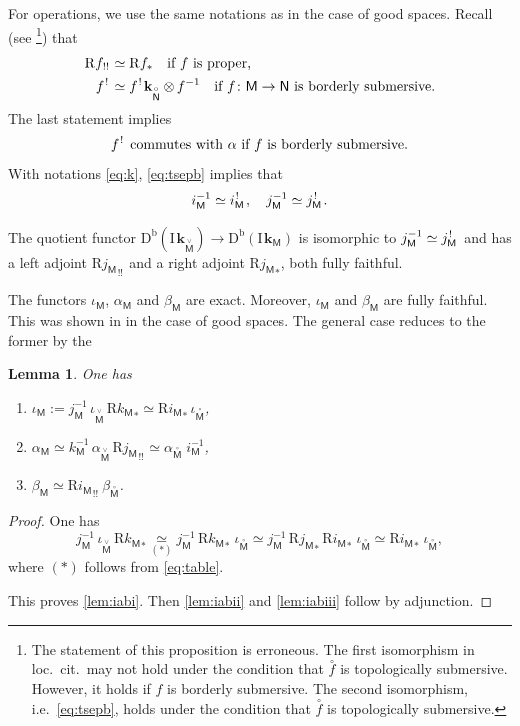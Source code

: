 \documentclass[11pt]{article}
\numberwithin{equation}{section}
\newenvironment{enumeratei}
{\bgroup\def\theenumi{\roman{enumi}}\def\theenumii{\alph{enumii}}\begin{enumerate}}
{\end{enumerate}\egroup}
\newcommand{\accentset}[2]{\overset{#1}{#2}}
\theoremstyle{plain}
\newtheorem{lemma}[theorem]{Lemma}
\theoremstyle{definition}
\newcommand{\derived}[1]{\mathrm{#1}}
\newcommand{\derd}{\derived{D}}
\newcommand{\derr}{\derived{R}}
\newcommand{\BDC}{\derd^{\mathrm{b}}}
\newcommand{\roim}[1]{\derr#1_*}
\newcommand{\reeim}[1]{\derr#1_{\mspace{1mu}!!}\mspace{1mu}}
\newcommand{\epb}[1]{#1^{\mspace{1.5mu}!}\mspace{2mu}}
\newcommand{\field}{\mathbf{k}}\let\cor\field
\newcommand{\ind}{\mathrm{I}\mspace{2mu}}
\newcommand{\ifield}{\ind\field}
\newcommand{\bclose}[1]{{\accentset{\vee}{#1}}}\let\cc\bclose
\newcommand{\unbordered}[1]{{\accentset{\circ}{#1}}}
\let\oo \unbordered
\newcommand{\bbM}{\mathsf{M}}
\newcommand{\obM}{\unbordered{\bbM}}
\newcommand{\cbM}{\bclose{\bbM}}
\newcommand{\bbN}{\mathsf{N}}
\newcommand{\obN}{\unbordered{\bbN}}
\newcommand{\inc}[1][\bbM]{k_{#1}}
\newcommand{\defeq}{\mathbin{:=}}\let \seteq\defeq
\newcommand{\tens}[1][]{\mathbin{\otimes_{\raise1.5ex\hbox to-.1em{}#1}}}
\newcommand{\opb}[1]{#1^{-1}}
\begin{document}
For operations, we use the same notations as in the case of good spaces.
Recall (see \cite[Prop.\,3.3.19]{DK16}\footnote{The statement of this proposition is erroneous.
The first isomorphism in loc.\ cit.\ may not hold
under the condition that $\oo f$ is topologically submersive.
However, it holds if $f$ is borderly submersive.
The second isomorphism, i.e.\ \eqref{eq:tsepb}, holds under the condition that $\oo f$ is topologically submersive.}) that
\begin{align}
\reeim f&\simeq\roim f\quad \text{if $f$ is proper,}\notag\\
\epb f&\simeq\epb f \field_{\obN}\tens\opb f\quad
\text{if $f\colon\bbM\to\bbN$ is borderly submersive.}
\label{eq:tsepb}
\end{align}
The last statement implies
\begin{equation}
\text{$\epb f$ commutes with $\alpha$
if $f$ is borderly submersive.}\label{st:tsepb}
\end{equation}
With notations \eqref{eq:k}, \eqref{eq:tsepb} implies that
\begin{equation}\label{eq:i*!}
\opb i_\bbM \simeq \epb{i_\bbM},\quad \opb j_\bbM \simeq \epb{j_\bbM}.
\end{equation}

The quotient functor $\BDC(\ifield_\cbM)\to \BDC(\ifield_\bbM)$
is isomorphic to $\opb j_\bbM\simeq\epb{j_\bbM}$
and has a left adjoint $\reeim{{j_\bbM}}$ and a right adjoint $\roim{{j_\bbM}}$, both fully faithful.

The functors $\iota_\bbM$, $\alpha_\bbM$ and $\beta_\bbM$ are exact. Moreover, $\iota_\bbM$ and $\beta_\bbM$ are fully faithful. This was shown in \cite{KS01} in the case of good spaces. The general case reduces to the former by the

\begin{lemma}\label{lem:iab}
One has
\begin{enumeratei}
\item\label{lem:iabi}
$\iota_\bbM \defeq \opb j_\bbM \,\iota_\cbM \,\roim{{\inc}} \simeq \roim{{i_\bbM}}\, \iota_\obM$,
\item\label{lem:iabii}
$\alpha_\bbM \simeq \opb\inc \,\alpha_\cbM \,\reeim{{j_\bbM}} \simeq \alpha_\obM\; \opb i_\bbM$,
\item\label{lem:iabiii}
$\beta_\bbM \simeq \reeim{{i_\bbM}}\, \beta_\obM$.
\end{enumeratei}
\end{lemma}

\begin{proof}
One has
\[
\opb j_\bbM\, \iota_\cbM \,\roim{{\inc}}
\underset{(*)}\simeq \opb j_\bbM \,\roim{{\inc}}\; \iota_\obM
\simeq \opb j_\bbM \,\roim{{j_\bbM}} \,\roim{{i_\bbM}}\; \iota_\obM
\simeq \roim{{i_\bbM}}\; \iota_\obM ,
\]
where $(*)$ follows from \eqref{eq:table}.

This proves \eqref{lem:iabi}. Then \eqref{lem:iabii} and \eqref{lem:iabiii} follow by adjunction.
\end{proof}
\end{document}
